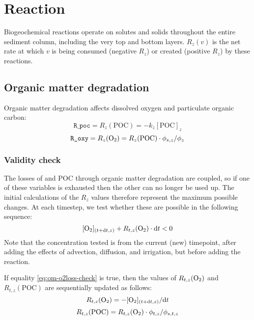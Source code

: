 \documentclass[a4paper]{article}
\newcommand{\D}[1]{\mathrm{d}#1}
\newcommand{\code}[1]{\texttt{#1}}
\begin{document}
\section{Reaction}\label{sx:reaction}

Biogeochemical reactions operate on solutes and solids throughout the entire sediment column, including the very top and bottom layers.  $R_z(v)$ is the net rate at which $v$ is being consumed (negative $R_z$) or created (positive $R_z$) by these reactions.


\subsection{Organic matter degradation}

Organic matter degradation affects dissolved oxygen and particulate organic carbon:
\begin{equation}
\code{R\_poc} = R_z(\mathrm{POC}) = -k_z [\mathrm{POC}]_z
\end{equation}
\begin{equation}\label{r_O2}
\code{R\_oxy} = R_z(\ce{O2}) = R_z(\mathrm{POC}) \cdot \phi_{s,z} / \phi_z
\end{equation}


\subsubsection{Validity check}

The losses of  and POC through organic matter degradation are coupled, so if one of these variables is exhausted then the other can no longer be used up.  The initial calculations of the $R_z$ values therefore represent the maximum possible changes.  At each timestep, we test whether these are possible in the following sequence:
\begin{equation}\label{eq:om-o2loss-check}
[\ce{O2}]_{(t+\D{t}, z)} + R_{t,z}(\ce{O2}) \cdot \D{t} < 0
\end{equation}
Note that the  concentration tested is from the current (new) timepoint, after adding the effects of advection, diffusion, and irrigation, but before adding the reaction.

If equality \eqref{eq:om-o2loss-check} is true, then the values of $R_{t,z}(\ce{O2})$ and $R_{t,z}(\mathrm{POC})$ are sequentially updated as follows:
\begin{equation}
R_{t,z}(\ce{O2}) = -[\ce{O2}]_{(t+\D{t}, z)} / \D{t}
\end{equation}
\begin{equation}
R_{t,z}(\mathrm{POC}) = R_{t,z}(\ce{O2}) \cdot \phi_{t,z} / \phi_{s,t,z}
\end{equation}
\end{document}
